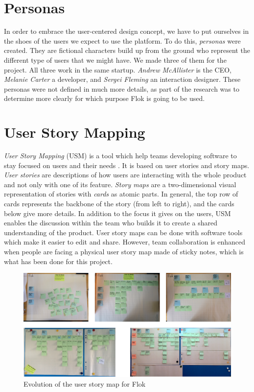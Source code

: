 \documentclass[a4paper,12pt, oneside]{article}
\begin{document}

\section{Personas}
In order to embrace the user-centered design concept, we have to put ourselves in the shoes of the users we expect to use the platform. To do this, \emph{personas} were created.
They are fictional characters build up from the ground who represent the different type of users that we might have.
We made three of them for the project.
All three work in the same startup. \emph{Andrew McAllister} is the CEO, \emph{Melanie Carter} a developer, and \emph{Sergei Fleming} an interaction designer.
These personas were not defined in much more details, as part of the research was to determine more clearly for which purpose Flok is going to be used.

\section{User Story Mapping}
\emph{User Story Mapping} (USM) is a tool which help teams developing software to stay focused on users and their needs \cite{patton2014user}.
It is based on user stories and story maps. \emph{User stories} are descriptions of how users are interacting with the whole product and not only with one of its feature. \emph{Story maps} are a two-dimensional visual representation of stories with \emph{cards} as atomic parts.
In general, the top row of cards represents the backbone of the story (from left to right), and the cards below give more details.
In addition to the focus it gives on the users, USM enables the discussion within the team who builds it to create a shared understanding of the product.
User story maps can be done with software tools which make it easier to edit and share. However, team collaboration is enhanced when people are facing a physical user story map made of sticky notes, which is what has been done for this project.

\begin{figure}[!htb]
    \centering
    \includegraphics[width=\textwidth]{images/flokUsmEvolution.png}
    \caption{Evolution of the user story map for Flok}
    \label{fig.flokUsmEvolution}
\end{figure}
\end{document}
